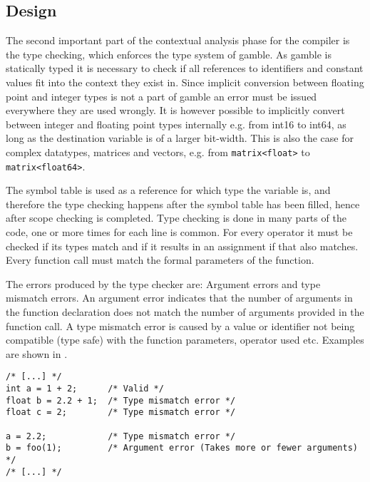 \subsection*{Design}
The second important part of the contextual analysis phase for the compiler is the type checking, which enforces the type system of \gls{gamble}.
As \gls{gamble} is statically typed it is necessary to check if all references to identifiers and constant values fit into the context they exist in. 
Since implicit conversion between floating point and integer types is not a part of \gls{gamble} an error must be issued everywhere they are used wrongly. 
It is however possible to implicitly convert between integer and floating point types internally e.g. from int16 to int64, as long as the destination variable is of a larger bit-width.
This is also the case for complex datatypes, matrices and vectors, e.g. from \texttt{matrix<float>} to \texttt{matrix<float64>}. 

The symbol table is used as a reference for which type the variable is, and therefore the type checking happens after the symbol table has been filled, hence after scope checking is completed. 
Type checking is done in many parts of the code, one or more times for each line is common. 
For every operator it must be checked if its types match and if it results in an assignment if that also matches.
Every function call must match the formal parameters of the function. 

The errors produced by the type checker are: Argument errors and type mismatch errors.
An argument error indicates that the number of arguments in the function declaration does not match the number of arguments provided in the function call.
A type mismatch error is caused by a value or identifier not being compatible (type safe) with the function parameters, operator used etc.
Examples are shown in .

\begin{lstlisting}[caption=Examples of type errors in \gls{gamble},numbers=none,frame=tlrb,label={lst:typeErrors}]
/* [...] */
int a = 1 + 2;      /* Valid */
float b = 2.2 + 1;  /* Type mismatch error */
float c = 2;        /* Type mismatch error */

a = 2.2;            /* Type mismatch error */
b = foo(1);         /* Argument error (Takes more or fewer arguments) */ 
/* [...] */
\end{lstlisting}

